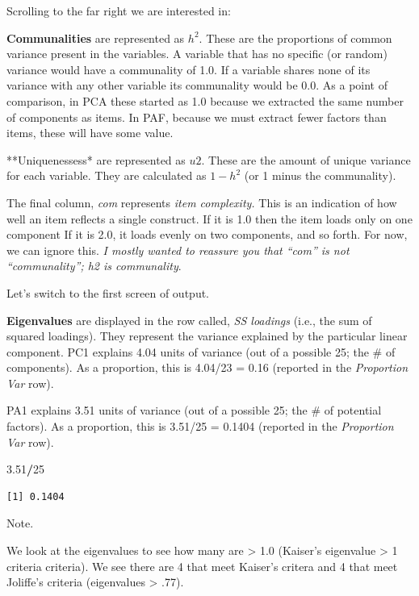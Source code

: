 \documentclass[
  english,
]{book}
\newenvironment{Shaded}{\begin{snugshade}}{\end{snugshade}}
\newcommand{\DecValTok}[1]{\textcolor[rgb]{0.00,0.00,0.81}{#1}}
\newcommand{\FloatTok}[1]{\textcolor[rgb]{0.00,0.00,0.81}{#1}}
\newcommand{\OperatorTok}[1]{\textcolor[rgb]{0.81,0.36,0.00}{\textbf{#1}}}
\begin{document}
Scrolling to the far right we are interested in:

\textbf{Communalities} are represented as \(h^2\). These are the proportions of common variance present in the variables. A variable that has no specific (or random) variance would have a communality of 1.0. If a variable shares none of its variance with any other variable its communality would be 0.0. As a point of comparison, in PCA these started as 1.0 because we extracted the same number of components as items. In PAF, because we must extract fewer factors than items, these will have some value.

**Uniquenessess* are represented as \(u2\). These are the amount of unique variance for each variable. They are calculated as \(1 - h^2\) (or 1 minus the communality).

The final column, \emph{com} represents \emph{item complexity.} This is an indication of how well an item reflects a single construct. If it is 1.0 then the item loads only on one component If it is 2.0, it loads evenly on two components, and so forth. For now, we can ignore this. \emph{I mostly wanted to reassure you that ``com'' is not ``communality''; h2 is communality}.

Let's switch to the first screen of output.

\textbf{Eigenvalues} are displayed in the row called, \emph{SS loadings} (i.e., the sum of squared loadings). They represent the variance explained by the particular linear component. PC1 explains 4.04 units of variance (out of a possible 25; the \# of components). As a proportion, this is 4.04/23 = 0.16 (reported in the \emph{Proportion Var} row).

PA1 explains 3.51 units of variance (out of a possible 25; the \# of potential factors). As a proportion, this is 3.51/25 = 0.1404 (reported in the \emph{Proportion Var} row).

\begin{Shaded}
\begin{Highlighting}[]
\FloatTok{3.51}\OperatorTok{/}\DecValTok{25}
\end{Highlighting}
\end{Shaded}

\begin{verbatim}
[1] 0.1404
\end{verbatim}

Note.

We look at the eigenvalues to see how many are \textgreater{} 1.0 (Kaiser's eigenvalue \textgreater{} 1 criteria criteria). We see there are 4 that meet Kaiser's critera and 4 that meet Joliffe's criteria (eigenvalues \textgreater{} .77).
\end{document}
